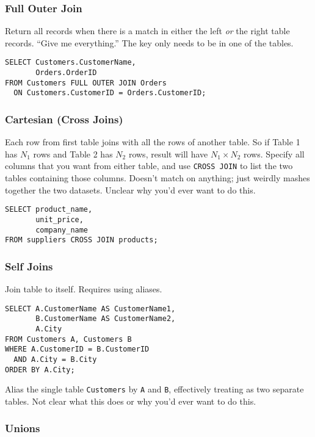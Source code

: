 \documentclass[12pt]{article}
\theoremstyle{plain}
\theoremstyle{definition}
\theoremstyle{remark}
\begin{document}
\subsubsection{Full Outer Join}

Return all records when there is a match in either the left
\emph{or} the right table records. ``Give me everything.''
The key only needs to be in one of the tables.
\begin{lstlisting}
SELECT Customers.CustomerName,
       Orders.OrderID
FROM Customers FULL OUTER JOIN Orders
  ON Customers.CustomerID = Orders.CustomerID;
\end{lstlisting}



\subsubsection{Cartesian (Cross Joins)}

Each row from first table joins with all the rows of another table.
So if Table 1 has $N_1$ rows and Table 2 has $N_2$ rows, result will
have $N_1\times N_2$ rows.
Specify all columns that you want from either table, and use
\texttt{CROSS JOIN} to list the two tables containing those columns.
Doesn't match on anything; just weirdly mashes together the two
datasets. Unclear  why you'd ever want to do this.
\begin{lstlisting}
SELECT product_name,
       unit_price,
       company_name
FROM suppliers CROSS JOIN products;
\end{lstlisting}


\subsubsection{Self Joins}

Join table to itself. Requires using aliases.
\begin{lstlisting}
SELECT A.CustomerName AS CustomerName1,
       B.CustomerName AS CustomerName2,
       A.City
FROM Customers A, Customers B
WHERE A.CustomerID = B.CustomerID
  AND A.City = B.City
ORDER BY A.City;
\end{lstlisting}
Alias the single table \texttt{Customers} by \texttt{A} and
\texttt{B}, effectively treating as two separate tables.
Not clear what this does or why you'd ever want to do this.


\subsubsection{Unions}
\end{document}
